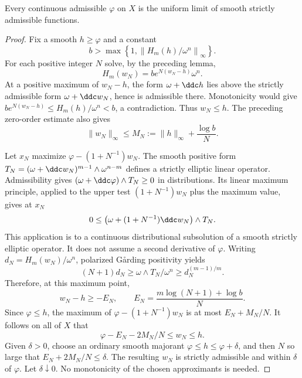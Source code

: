\begin{lemma}\label{draft:604-continuous-smooth-approximation}
Every continuous admissible $\varphi$ on $X$ is the uniform limit of
smooth strictly admissible functions.
\end{lemma}
\begin{proof}
Fix a smooth $h\geq\varphi$ and a constant
\[
 b>\max\left\{1,\left\|H_m(h)/\omega^n\right\|_\infty\right\}.
\]
For each positive integer $N$ solve, by the preceding lemma,
\[
 H_m(w_N)=b e^{N(w_N-h)}\omega^n.
\]
At a positive maximum of $w_N-h$, the form $\omega+\ddc h$ lies above
the strictly admissible form $\omega+\ddc w_N$, hence is admissible there.
Monotonicity would give
$b e^{N(w_N-h)}\leq H_m(h)/\omega^n<b$, a contradiction.
Thus $w_N\leq h$. The preceding zero-order estimate also gives
\[
 \|w_N\|_\infty\leq M_N:=\|h\|_\infty+\frac{\log b}{N}.
\]

Let $x_N$ maximize $\varphi-(1+N^{-1})w_N$.
The smooth positive form
$T_N=(\omega+\ddc w_N)^{m-1}\wedge\omega^{n-m}$
defines a strictly elliptic linear operator. Admissibility gives
$(\omega+\ddc\varphi)\wedge T_N\geq0$ in distributions.
Its linear maximum principle, applied to the upper test
$(1+N^{-1})w_N$ plus the maximum value, gives at $x_N$
\[
 0\leq\bigl(\omega+(1+N^{-1})\ddc w_N\bigr)\wedge T_N.
\]
This application is to a continuous distributional subsolution of a
smooth strictly elliptic operator. It does not assume a second derivative
of $\varphi$. Writing $d_N=H_m(w_N)/\omega^n$, polarized G\aa rding
positivity yields
\[
 (N+1)d_N\geq \omega\wedge T_N/\omega^n
                         \geq d_N^{(m-1)/m}.
\]
Therefore, at this maximum point,
\[
 w_N-h\geq-E_N,\qquad
 E_N=\frac{m\log(N+1)+\log b}{N}.
\]
Since $\varphi\leq h$, the maximum of
$\varphi-(1+N^{-1})w_N$ is at most $E_N+M_N/N$.
It follows on all of $X$ that
\[
 \varphi-E_N-2M_N/N\leq w_N\leq h.
\]
Given $\delta>0$, choose an ordinary smooth majorant
$\varphi\leq h\leq\varphi+\delta$, and then $N$ so large that
$E_N+2M_N/N\leq\delta$. The resulting $w_N$ is strictly admissible
and within $\delta$ of $\varphi$. Let $\delta\downarrow0$.
No monotonicity of the chosen approximants is needed.
\end{proof}

